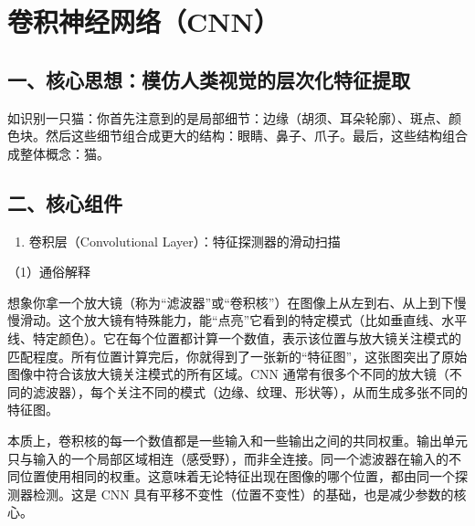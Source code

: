 \setcounter{section}{0}

\hypertarget{ux5377ux79efux795eux7ecfux7f51ux7edccnn}{%
\section{卷积神经网络（CNN）}\label{ux5377ux79efux795eux7ecfux7f51ux7edccnn}}

\hypertarget{ux4e00ux6838ux5fc3ux601dux60f3ux6a21ux4effux4ebaux7c7bux89c6ux89c9ux7684ux5c42ux6b21ux5316ux7279ux5f81ux63d0ux53d6}{%
\subsection{一、核心思想：模仿人类视觉的层次化特征提取}\label{ux4e00ux6838ux5fc3ux601dux60f3ux6a21ux4effux4ebaux7c7bux89c6ux89c9ux7684ux5c42ux6b21ux5316ux7279ux5f81ux63d0ux53d6}}

如识别一只猫：你首先注意到的是局部细节：边缘（胡须、耳朵轮廓）、斑点、颜色块。然后这些细节组合成更大的结构：眼睛、鼻子、爪子。最后，这些结构组合成整体概念：猫。

\hypertarget{ux4e8cux6838ux5fc3ux7ec4ux4ef6}{%
\subsection{二、核心组件}\label{ux4e8cux6838ux5fc3ux7ec4ux4ef6}}

\begin{enumerate}
\def\labelenumi{\arabic{enumi}.}
\tightlist
\item
  卷积层（Convolutional Layer）：特征探测器的滑动扫描
\end{enumerate}

（1）通俗解释

想象你拿一个放大镜（称为``滤波器''或``卷积核''）在图像上从左到右、从上到下慢慢滑动。这个放大镜有特殊能力，能``点亮''它看到的特定模式（比如垂直线、水平线、特定颜色）。它在每个位置都计算一个数值，表示该位置与放大镜关注模式的匹配程度。所有位置计算完后，你就得到了一张新的``特征图''，这张图突出了原始图像中符合该放大镜关注模式的所有区域。CNN 通常有很多个不同的放大镜（不同的滤波器），每个关注不同的模式（边缘、纹理、形状等），从而生成多张不同的特征图。

本质上，卷积核的每一个数值都是一些输入和一些输出之间的共同权重。输出单元只与输入的一个局部区域相连（感受野），而非全连接。同一个滤波器在输入的不同位置使用相同的权重。这意味着无论特征出现在图像的哪个位置，都由同一个探测器检测。这是 CNN 具有平移不变性（位置不变性）的基础，也是减少参数的核心。

